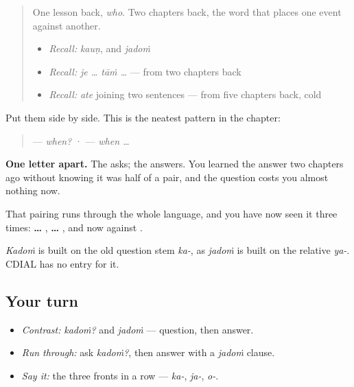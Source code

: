 \label{lesson:PA-C43-kadon}



\begin{quote}
One lesson back, \emph{who}. Two chapters back, the word that places one event against another.

\begin{itemize}
\raggedright
  \item \emph{Recall:} \emph{kauṇ}, and \emph{jadoṁ}
  \item \emph{Recall:} \emph{je … tāṁ …} — from two chapters back
  \item \emph{Recall:} \emph{ate} joining two sentences — from five chapters back, cold
\end{itemize}
\end{quote}

\begin{cousinweb}
Put them side by side. This is the neatest pattern in the chapter:

\begin{quote}
\textbf{} — \emph{when?} · \textbf{} — \emph{when …}
\end{quote}

\textbf{One letter apart.} The \textbf{} asks; the \textbf{} answers. You learned the answer two chapters ago without knowing it was half of a pair, and the question costs you almost nothing now.

That pairing runs through the whole language, and you have now seen it three times: \textbf{ … }, \textbf{ … }, and now \textbf{} against \textbf{}.

\emph{Kadoṁ} is built on the old question stem \emph{ka-}, as \emph{jadoṁ} is built on the relative \emph{ya-}. CDIAL has no entry for it.
\end{cousinweb}

\subsection*{Your turn}
\begin{itemize}
\raggedright
  \item \emph{Contrast:} \emph{kadoṁ?} and \emph{jadoṁ} — question, then answer.
  \item \emph{Run through:} ask \emph{kadoṁ?}, then answer with a \emph{jadoṁ} clause.
  \item \emph{Say it:} the three fronts in a row — \emph{ka-}, \emph{ja-}, \emph{o-}.
\end{itemize}

